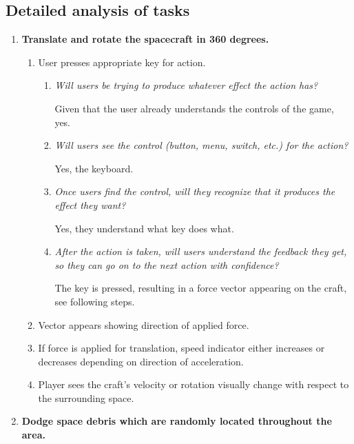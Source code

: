 \subsection{Detailed analysis of tasks}
\begin{enumerate}

\item\textbf{Translate and rotate the spacecraft in 360 degrees.}
\begin{enumerate}

  \item User presses appropriate key for action.
  \begin{enumerate}
    \item \emph{Will users be trying to produce whatever effect the action has?}

    Given that the user already understands the controls of the game, yes.		
    \item \emph{Will users see the control (button, menu, switch, etc.) for the action?}
    
    Yes, the keyboard.
    \item \emph{Once users find the control, will they recognize that it produces the effect they want?}
    
    Yes, they understand what key does what.
    \item \emph{After the action is taken, will users understand the feedback they get, so they can go on to the next action with confidence?}
    
    The key is pressed, resulting in a force vector appearing on the craft, see following steps.
  \end{enumerate}

  \item Vector appears showing direction of applied force.

  \item If force is applied for translation, speed indicator either increases or decreases depending on direction of acceleration.

  \item Player sees the craft's velocity or rotation visually change with respect to the surrounding space.

\end{enumerate}

\item\textbf{Dodge space debris which are randomly located throughout the area.}
\begin{enumerate}


\end{enumerate}
\end{enumerate}
